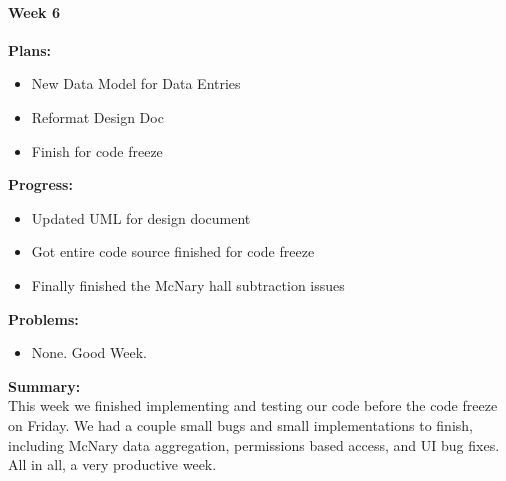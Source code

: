 \paragraph{Week 6}
\begin{adjustwidth}{2.5em}{0pt}
    \vspace{-0.5cm}\textbf{Plans:}
    \vspace{-0.5cm}
    \begin{itemize}
        \item New Data Model for Data Entries
        \item Reformat Design Doc
        \item Finish for code freeze
    \end{itemize} 
    \vspace{-0.3cm}\textbf{Progress:}
    \vspace{-0.5cm}
    \begin{itemize}
        \item Updated UML for design document
        \item Got entire code source finished for code freeze
        \item Finally finished the McNary hall subtraction issues
    \end{itemize} 
    \vspace{-0.3cm}\textbf{Problems:}
    \vspace{-0.5cm}
    \begin{itemize}
        \item None. Good Week.
    \end{itemize}  
    \vspace{-0.3cm}\noindent\textbf{Summary:}\\
    \noindent This week we finished implementing and testing our code before the code freeze on Friday. We had a couple small bugs and small implementations to finish, including McNary data aggregation, permissions based access, and UI bug fixes. All in all, a very productive week.
\end{adjustwidth} 
